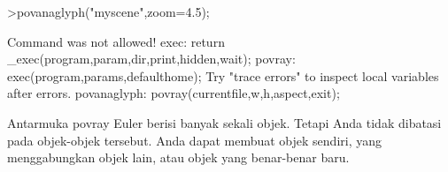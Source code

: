 \documentclass[12pt,arial,letterpaper]{book}
\begin{document}
\begin{eulernootebook}
\begin{eulercomment}
\begin{eulercomment}
\begin{eulernootebook}
\begin{eulercomment}
\begin{eulercomment}
\begin{eulercomment}
\begin{eulercomment}
\begin{eulercomment}
\begin{eulercomment}
\begin{eulercomment}
\begin{eulernotebook}
\begin{eulerprompt}
>povanaglyph("myscene",zoom=4.5);
\end{eulerprompt}
\begin{euleroutput}
  Command was not allowed!
  exec:
      return _exec(program,param,dir,print,hidden,wait);
  povray:
      exec(program,params,defaulthome);
  Try "trace errors" to inspect local variables after errors.
  povanaglyph:
      povray(currentfile,w,h,aspect,exit); 
\end{euleroutput}
\begin{eulercomment}
Antarmuka povray Euler berisi banyak sekali objek. Tetapi Anda tidak
dibatasi pada objek-objek tersebut. Anda dapat membuat objek sendiri,
yang menggabungkan objek lain, atau objek yang benar-benar baru.


\end{eulercomment}
\end{eulernotebook}
\end{eulercomment}
\end{eulercomment}
\end{eulercomment}
\end{eulercomment}
\end{eulercomment}
\end{eulercomment}
\end{eulercomment}
\end{eulernootebook}
\end{eulercomment}
\end{eulercomment}
\end{eulernootebook}
\end{document}
